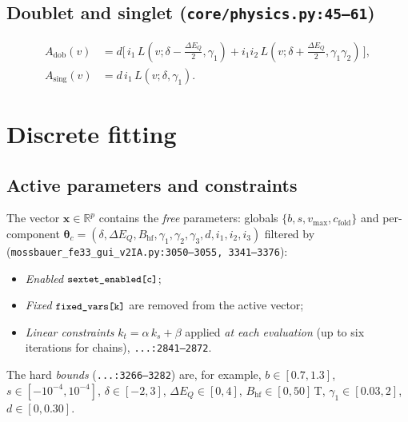 \documentclass[11pt,a4paper]{article}
\newcommand{\BHF}{B_{\mathrm{hf}}}
\newcommand{\dEQ}{\Delta E_{Q}}
\newcommand{\code}[1]{\texttt{\small #1}}
\newcommand{\file}[1]{\textcolor{black!70}{\texttt{\small #1}}}
\begin{document}
\subsection{Doublet and singlet (\file{core/physics.py:45--61})}
\begin{align}
  A_{\text{dob}}(v) &= d\bigl[\,i_1\,L(v;\delta-\tfrac{\dEQ}{2},\gamma_1) + i_1 i_2\,L(v;\delta+\tfrac{\dEQ}{2},\gamma_1\gamma_2)\,\bigr],\\
  A_{\text{sing}}(v) &= d\,i_1\,L(v;\delta,\gamma_1).
\end{align}

\section{Discrete fitting}\label{sec:disc}

\subsection{Active parameters and constraints}\label{sec:active}
The vector $\bm x \in \mathbb R^{p}$ contains the \emph{free} parameters: globals $\{b,s,v_{\max},c_{\text{fold}}\}$ and per-component $\bm\theta_c=(\delta,\dEQ,\BHF,\gamma_1,\gamma_2,\gamma_3,d,i_1,i_2,i_3)$ filtered by (\file{mossbauer\_fe33\_gui\_v2IA.py:3050--3055, 3341--3376}):
\begin{itemize}[leftmargin=*]
  \item \emph{Enabled} $\code{sextet\_enabled[c]}$;
  \item \emph{Fixed} $\code{fixed\_vars[k]}$ are removed from the active vector;
  \item \emph{Linear constraints} $k_t = \alpha\, k_s + \beta$ applied \emph{at each evaluation} (up to six iterations for chains), \file{...:2841--2872}.
\end{itemize}
The hard \emph{bounds} (\file{...:3266--3282}) are, for example,
$b\in[0{.}7,1{.}3]$, $s\in[-10^{-4},10^{-4}]$, $\delta\in[-2,3]$, $\dEQ\in[0,4]$, $\BHF\in[0,50]\,$T, $\gamma_1\in[0{.}03,2]$, $d\in[0,0{.}30]$.
\end{document}

